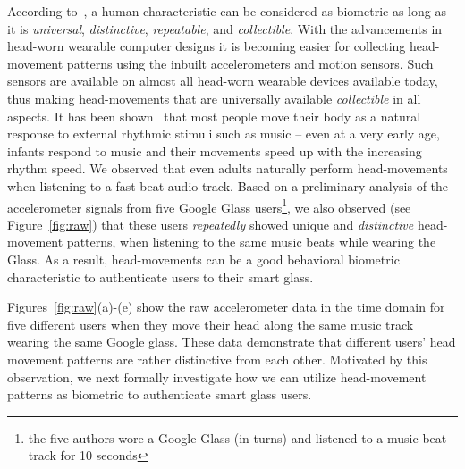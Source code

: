\iffalse
\vspace{4pt}{\bf Head-movements as a behavioral biometric.}
According to~\cite{jain2004introduction}, a human characteristic can be
considered as biometric as long as it is \emph{universal}, \emph{distinctive},
\emph{repeatable}, and \emph{collectible}. With the advancements in head-worn
wearable computer designs it is becoming easier for collecting head-movement
patterns using the inbuilt accelerometers and motion sensors. Such sensors are
available on almost all head-worn wearable devices available today, thus
making head-movements that are universally available {\em collectible} in all aspects. It has been
shown~\cite{zentner2010rhythmic} that most people move their body
as a natural response to external rhythmic stimuli such as music -- even at a
very early age, infants respond to music and their movements speed up with the
increasing rhythm speed. We observed that even adults naturally perform
head-movements when listening to a fast beat audio track. Based on a
preliminary analysis of the accelerometer signals from five Google Glass
users\footnote{the five authors wore a Google Glass (in turns) and listened to
a music
beat track for 10 seconds}, we also observed (see Figure~\ref{fig:raw}) that these
users {\em
repeatedly} showed unique and {\em distinctive} head-movement patterns, when
listening to the same music beats while wearing the Glass. As a result, head-movements can be a good behavioral biometric characteristic to authenticate users to their smart glass.

Figures~\ref{fig:raw}(a)-(e) show the raw accelerometer data in the time domain for five different users when they move their head along the same music track wearing the same Google glass. These data demonstrate that different users' head movement patterns are rather distinctive from each other. Motivated by this observation, we next formally investigate how we can utilize head-movement patterns as biometric to authenticate smart glass users.


